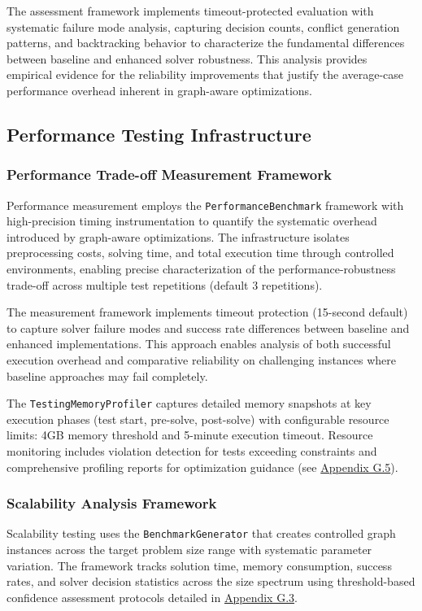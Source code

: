 The assessment framework implements timeout-protected evaluation with systematic failure mode analysis, capturing decision counts, conflict generation patterns, and backtracking behavior to characterize the fundamental differences between baseline and enhanced solver robustness. This analysis provides empirical evidence for the reliability improvements that justify the average-case performance overhead inherent in graph-aware optimizations.

\subsection{Performance Testing Infrastructure}
\label{sec:performance-testing-infrastructure}

\subsubsection{Performance Trade-off Measurement Framework}
\label{sec:timing-measurement}
Performance measurement employs the \texttt{PerformanceBenchmark} framework with high-precision timing instrumentation to quantify the systematic overhead introduced by graph-aware optimizations. The infrastructure isolates preprocessing costs, solving time, and total execution time through controlled environments, enabling precise characterization of the performance-robustness trade-off across multiple test repetitions (default 3 repetitions).

The measurement framework implements timeout protection (15-second default) to capture solver failure modes and success rate differences between baseline and enhanced implementations. This approach enables analysis of both successful execution overhead and comparative reliability on challenging instances where baseline approaches may fail completely.

The \texttt{TestingMemoryProfiler} captures detailed memory snapshots at key execution phases (test start, pre-solve, post-solve) with configurable resource limits: 4GB memory threshold and 5-minute execution timeout. Resource monitoring includes violation detection for tests exceeding constraints and comprehensive profiling reports for optimization guidance (see \hyperref[appendix:memory-profiling-testing]{Appendix G.5}).

\subsubsection{Scalability Analysis Framework}
\label{sec:scalability-analysis}
Scalability testing uses the \texttt{BenchmarkGenerator} that creates controlled graph instances across the target problem size range with systematic parameter variation. The framework tracks solution time, memory consumption, success rates, and solver decision statistics across the size spectrum using threshold-based confidence assessment protocols detailed in \hyperref[appendix:performance-measurement]{Appendix G.3}.

